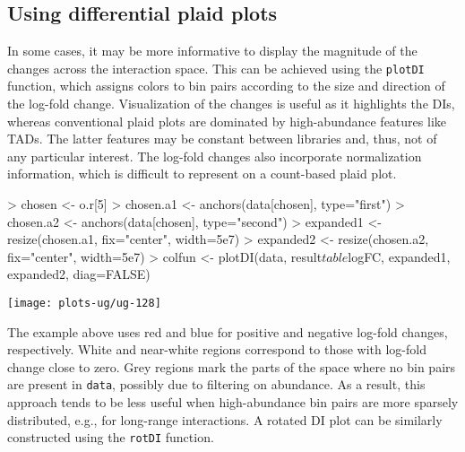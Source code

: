 \documentclass[12pt]{report}
\renewenvironment{Schunk}{\vspace{0pt}}{\vspace{0pt}}
\newcommand{\code}[1]{{\small\texttt{#1}}}
\begin{document}
\subsection{Using differential plaid plots}
In some cases, it may be more informative to display the magnitude of the changes across the interaction space.
This can be achieved using the \code{plotDI} function, which assigns colors to bin pairs according to the size and direction of the log-fold change.
Visualization of the changes is useful as it highlights the DIs, whereas conventional plaid plots are dominated by high-abundance features like TADs.
The latter features may be constant between libraries and, thus, not of any particular interest.
The log-fold changes also incorporate normalization information, which is difficult to represent on a count-based plaid plot.

\begin{Schunk}
\begin{Sinput}
> chosen <- o.r[5]
> chosen.a1 <- anchors(data[chosen], type="first")
> chosen.a2 <- anchors(data[chosen], type="second")
> expanded1 <- resize(chosen.a1, fix="center", width=5e7)
> expanded2 <- resize(chosen.a2, fix="center", width=5e7)
> colfun <- plotDI(data, result$table$logFC, expanded1, expanded2, diag=FALSE)
\end{Sinput}
\end{Schunk}

\begin{center}
\texttt{[image: plots-ug/ug-128]}
\end{center}


The example above uses red and blue for positive and negative log-fold changes, respectively.
White and near-white regions correspond to those with log-fold change close to zero.
Grey regions mark the parts of the space where no bin pairs are present in \code{data}, possibly due to filtering on abundance.
As a result, this approach tends to be less useful when high-abundance bin pairs are more sparsely distributed, e.g., for long-range interactions.
A rotated DI plot can be similarly constructed using the \code{rotDI} function.

\end{document}
